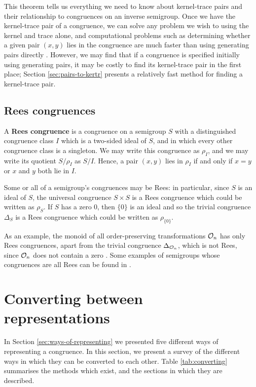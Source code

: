 This theorem tells us everything we need to know about kernel-trace pairs and
their relationship to congruences on an inverse semigroup.  Once we have the
kernel-trace pair of a congruence, we can solve any problem we wish to using the
kernel and trace alone, and computational problems such as determining whether a
given pair $(x,y)$ lies in the congruence are much faster than using
generating pairs directly \cite[\S 6.1.3]{mtorpey_msc}.  However, we may find
that if a congruence is specified initially using generating pairs, it may be
costly to find its kernel-trace pair in the first place; Section
\ref{sec:pairs-to-kertr} presents a relatively fast method for finding a kernel-trace pair.

\subsection{Rees congruences}
A \textbf{Rees congruence} is a congruence on a semigroup $S$ with a
distinguished congruence class $I$ which is a two-sided ideal of $S$, and in
which every other congruence class is a singleton.  We may write this congruence
as $\rho_I$, and we may write its quotient $S/\rho_I$ as $S/I$.  Hence, a pair
$(x,y)$ lies in $\rho_I$ if and only if $x=y$ or $x$ and $y$ both lie in $I$.

Some or all of a semigroup's congruences may be Rees: in particular, since $S$
is an ideal of $S$, the universal congruence $S \times S$ is a Rees congruence
which could be written as $\rho_S$.  If $S$ has a zero $0$, then $\{0\}$ is an
ideal and so the trivial congruence $\Delta_S$ is a Rees congruence which could
be written as $\rho_{\{0\}}$.

As an example, the monoid of all order-preserving transformations $\mathcal{O}_n$ has
only Rees congruences, apart from the trivial congruence $\Delta_{\mathcal{O}_n}$, which
is not Rees, since $\mathcal{O}_n$ does not contain a zero \cite{lavers_1999}.
Some examples of semigroups whose congruences are all Rees can be found in
\cite[\S 5]{garcia_1991}.

\section{Converting between representations}
\label{sec:converting}

In Section \ref{sec:ways-of-representing} we presented five different ways of
representing a congruence.  In this section, we present a survey of the
different ways in which they can be converted to each other.  Table
\ref{tab:converting} summarises the methods which exist, and the sections in
which they are described.

